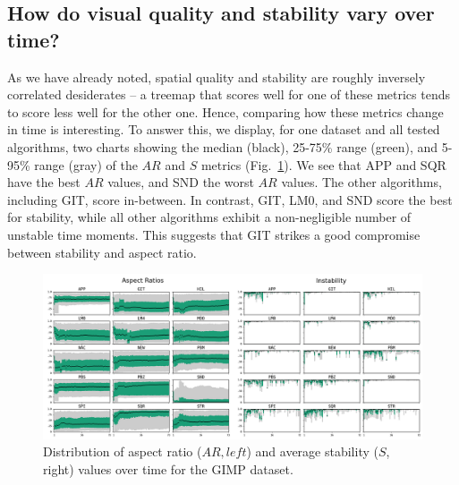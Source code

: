 \subsection{How do visual quality and stability vary over time?}
%
As we have already noted, spatial quality and stability are roughly inversely correlated desiderates -- a treemap that scores well for one of these metrics tends to score less well for the other one. Hence, comparing how these metrics change in time is interesting. To answer this, we display, for one dataset and all tested algorithms, two charts showing the median (black), 25-75\% range (green), and 5-95\% range (gray) of the $AR$ and $S$ metrics (Fig.~\ref{fig:boxplots}). We see that APP and SQR have the best $AR$ values, and SND the worst $AR$ values. The other algorithms, including GIT, score in-between. In contrast, GIT, LM0, and SND score the best for stability, while all other algorithms exhibit a non-negligible number of unstable time moments. This suggests that GIT strikes a good compromise between stability and aspect ratio.


\begin{figure}
\centering
\includegraphics[width=\textwidth]{figures/treemap-algorithm/boxplots-gimp.png}
\caption{Distribution of aspect ratio ($AR, left$) and average stability ($S$, right) values over time for the GIMP dataset.}
\label{fig:boxplots}
\end{figure}

